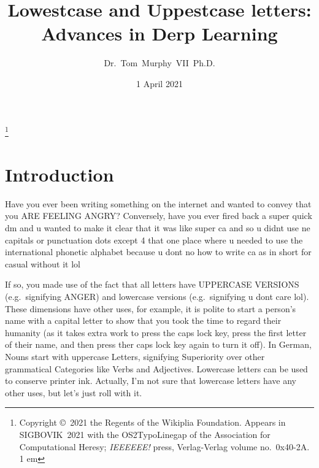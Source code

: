 \documentclass[twocolumn]{article} %
\begin{document}
\title{Lowestcase and Uppestcase letters: Advances in Derp Learning}
\author{Dr.~Tom~Murphy~VII~Ph.D.}\thanks{
Copyright \copyright\ 2021 the Regents of the Wikiplia Foundation.
Appears in SIGBOVIK~2021 with the
OS2TypoLinegap of the Association for Computational Heresy; {\em IEEEEEE!}
press, Verlag-Verlag volume no.~0x40-2A. 1 em}


\newcommand\makelowercase{{\sf make\_lowercase}}
\newcommand\makeuppercase{{\sf make\_uppercase}}

\renewcommand\th{\ensuremath{{}^{\textrm{th}}}}
\newcommand\st{\ensuremath{{}^{\textrm{st}}}}
\newcommand\rd{\ensuremath{{}^{\textrm{rd}}}}
\newcommand\nd{\ensuremath{{}^{\textrm{nd}}}}
\newcommand\at{\ensuremath{\scriptstyle @}}

\renewcommand\paragraph[1]{\smallskip \noindent{\bf #1}\enspace}

\date{1 April 2021}

\maketitle \thispagestyle{empty}

\sloppypar


\section{Introduction}

Have you ever been writing something on the internet and wanted to convey
that you ARE FEELING ANGRY? Conversely, have you ever fired back a super
quick dm and u wanted to make it clear that it was like super ca
and so u didnt use ne capitals or punctuation dots except 4 that one place
where u needed to use the international phonetic alphabet because u dont
no how to write ca as in short for casual without it lol

If so, you made use of the fact that all letters have UPPERCASE
VERSIONS (e.g.~signifying ANGER) and lowercase versions
(e.g.~signifying u dont care lol). These dimensions have other uses,
for example, it is polite to start a person's name with a capital
letter to show that you took the time to regard their humanity (as it
takes extra work to press the caps lock key, press the first letter of
their name, and then press ther caps lock key again to turn it off).
In German, Nouns start with uppercase Letters, signifying Superiority
over other grammatical Categories like Verbs and Adjectives. Lowercase
letters can be used to conserve printer ink. Actually, I'm not sure that
lowercase letters have any other uses, but let's just roll with it.
\end{document}
